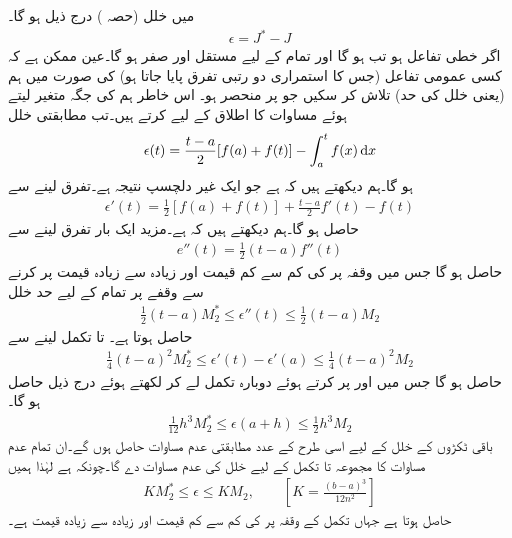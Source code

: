  میں خلل (حصہ )  درج ذیل ہو گا۔
\begin{align*}
\epsilon=J^*-J
\end{align*}
اگر  خطی تفاعل ہو تب  ہو گا اور تمام  کے لیے   مستقل اور  صفر ہو گا۔عین ممکن ہے کہ کسی عمومی تفاعل  (جس کا استمراری دو رتبی تفرق پایا جاتا ہو)  کی صورت میں ہم   (یعنی خلل  کی حد) تلاش کر سکیں جو  پر منحصر ہو۔ اس خاطر ہم  کی جگہ متغیر  لیتے ہوئے  مساوات  کا اطلاق  کے لیے کرتے ہیں۔تب مطابقتی خلل
\begin{align*}
\epsilon(t)=\frac{t-a}{2}[f(a)+f(t)]-\int_a^t f(x)\dif x
\end{align*}
ہو گا۔ہم دیکھتے ہیں کہ  ہے جو ایک غیر دلچسپ نتیجہ ہے۔تفرق لینے سے
\begin{align*}
\epsilon'(t)=\frac{1}{2}[f(a)+f(t)]+\frac{t-a}{2}f'(t)-f(t)
\end{align*}
حاصل ہو گا۔ہم دیکھتے ہیں کہ  ہے۔مزید ایک بار تفرق لینے سے
\begin{align*}
e''(t)=\frac{1}{2}(t-a)f''(t)
\end{align*}
حاصل ہو گا جس میں وقفہ  پر  کی کم سے کم قیمت   اور زیادہ سے زیادہ قیمت   پر کرنے سے وقفے پر تمام  کے لیے  حد خلل
\begin{align*}
\frac{1}{2}(t-a)M_2^*\le \epsilon''(t)\le \frac{1}{2}(t-a)M_2
\end{align*}
حاصل ہوتا ہے۔ تا  تکمل لینے سے
\begin{align*}
\frac{1}{4}(t-a)^2M_2^*\le \epsilon'(t)-\epsilon'(a)\le \frac{1}{4}(t-a)^2M_2
\end{align*}
حاصل ہو گا جس میں  اور  پر کرتے ہوئے دوبارہ تکمل لے کر  لکھتے ہوئے درج ذیل حاصل ہو گا۔
\begin{align*}
\frac{1}{12}h^3M_2^*\le \epsilon(a+h)\le \frac{1}{2}h^3M_2
\end{align*}
باقی  ٹکڑوں کے خلل کے لیے اسی طرح کے  عدد مطابقتی عدم مساوات  حاصل ہوں گے۔ان تمام  عدم مساوات کا مجموعہ  تا  تکمل کے لیے خلل  کی عدم مساوات دے گا۔چونکہ  ہے لہٰذا ہمیں
\begin{align}\label{مساوات_اعدادی_حد_خلل}
KM_2^*\le \epsilon\le KM_2,\quad \quad [K=\tfrac{(b-a)^3}{12n^2}]
\end{align}
حاصل ہوتا ہے جہاں تکمل کے  وقفہ پر  کی کم سے کم قیمت  اور زیادہ سے زیادہ قیمت  ہے۔

